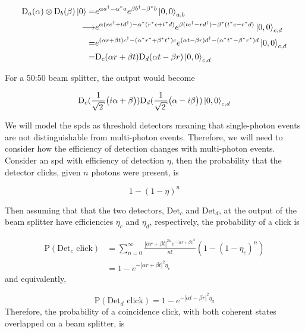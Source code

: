 \begin{align}
	\text{D}_a(\alpha)\otimes\text{D}_b(\beta)\ket{0} =&  e^{\alpha a^\dagger - \alpha^\ast a} e^{\beta b^\dagger - \beta^\ast b}\ket{0,0}_{a,b}\\
	\longrightarrow&  e^{\alpha (r c^\dagger + t d^\dagger) - \alpha^\ast (r^\ast c + t^\ast d)}e^{\beta (t c^\dagger - r d^\dagger) - \beta^\ast (t^\ast c - r^\ast d)}\ket{0,0}_{c,d}\\
	=&  e^{(\alpha r + \beta t) c^\dagger - (\alpha^\ast r^\ast + \beta^\ast t^\ast) c} e^{(\alpha t - \beta r) d^\dagger - (\alpha^\ast t^\ast - \beta^\ast r^\ast) d}\ket{0,0}_{c,d}\\
	=&  \text{D}_c(\alpha r + \beta t)\text{D}_d(\alpha t - \beta r)\ket{0,0}_{c,d}
\end{align}

For a 50:50 beam splitter, the output would become

\begin{equation}
	\text{D}_c(\frac{1}{\sqrt{2}}\big(i\alpha + \beta\big))\text{D}_d(\frac{1}{\sqrt{2}}\big(\alpha - i\beta\big))\ket{0,0}_{c,d}
\end{equation}

We will model the \acp{spd} as threshold detectors meaning that single-photon events are not distinguishable from multi-photon events. Therefore, we will need to consider how the efficiency of detection changes with multi-photon events. Consider an \ac{spd} with efficiency of detection $\eta$, then the probability that the detector clicks, given $n$ photons were present, is

\begin{equation}
	1 - (1 - \eta)^n
\end{equation}

Then assuming that that the two detectors, $\text{Det}_c$ and $\text{Det}_d$, at the output of the beam splitter have efficiencies $\eta_c$ and $\eta_d$, respectively, the probability of a click is

\begin{align}
	\text{P}(\text{Det}_c \text{ click}) &= \sum_{n=0}^\infty \frac{|\alpha r + \beta t|^{2n} e^{-|\alpha r + \beta t|^2}}{n!}(1-(1-\eta_c)^n)\\
	&= 1 - e^{-|\alpha r + \beta t|^2 \eta_c}
\end{align}
and equivalently,

\begin{equation}
	\text{P}(\text{Det}_d \text{ click}) = 1 - e^{-|\alpha t - \beta r|^2 \eta_d}
\end{equation}
Therefore, the probability of a coincidence click, with both coherent states overlapped on a beam splitter, is

